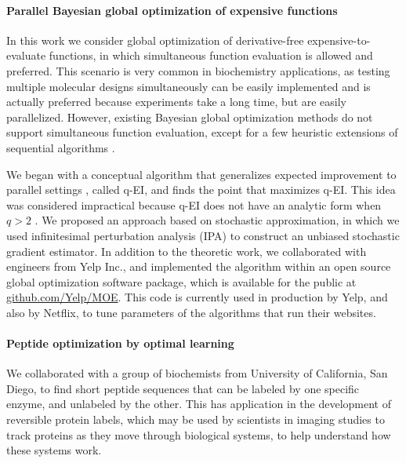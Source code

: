 \documentclass[11pt]{article}
\begin{document}
\paragraph{Parallel Bayesian global optimization of expensive functions
}

In this work we consider global optimization of derivative-free expensive-to-evaluate 
functions, in which simultaneous function evaluation is allowed and
preferred. This scenario is very common in biochemistry applications, as testing
multiple molecular designs simultaneously can be easily implemented and is actually
preferred because experiments take a long time, but are easily parallelized. However, 
existing Bayesian global optimization methods do not support simultaneous function 
evaluation, except for a few heuristic extensions of sequential algorithms \citep{ginsbourger2010kriging, janusevskis2012expected}. 

We began with a conceptual algorithm that
generalizes expected improvement \citep{jones1998efficient} to parallel settings \citep{ginsbourger2007multi}, 
called q-EI, and finds the point that maximizes q-EI. This idea was considered
impractical because q-EI does not have an analytic form when $q > 2$ \citep{ginsbourger2007multi}. 
We proposed an approach based on stochastic approximation, in which we used infinitesimal 
perturbation analysis (IPA) to construct an unbiased stochastic gradient estimator.
In addition to the theoretic work, we collaborated with engineers from Yelp Inc.,
and implemented the algorithm within an open source global optimization software
package, which is available for the public at \underline{github.com/Yelp/MOE}.  This code is currently used in production by Yelp, and also by Netflix, to tune parameters of the algorithms that run their websites.

\paragraph{Peptide optimization by optimal learning}

We collaborated with a group of biochemists from University of California, San Diego,
to find short peptide sequences that can be labeled by one specific enzyme, and 
unlabeled by the other.  This has application in the development of reversible protein labels, which may be used by scientists in imaging studies to track proteins as they move through biological systems, to help understand how these systems work.
\end{document}
